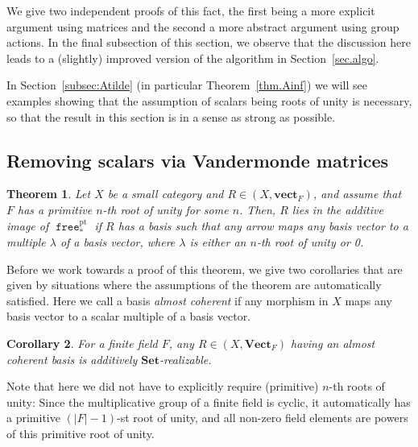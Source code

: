 \documentclass[a4paper]{amsart}
\theoremstyle{plain}
\newtheorem{theorem}{Theorem}[section]
\newtheorem{corollary}[theorem]{Corollary}
\theoremstyle{definition}
\theoremstyle{remark}
\newcommand{\funct}[1]{\operatorname{\mathtt{#1}}}
\newcommand{\Set}{\mathbf{Set}}
\newcommand{\VectF}{\mathbf{Vect}_F}
\newcommand{\vectF}{\mathbf{vect}_F}
\begin{document}
We give two independent proofs of this fact, the first being a more explicit argument using matrices and the second a more abstract argument using group actions. In the final subsection of this section, we observe that the discussion here leads to a (slightly) improved version of the algorithm in Section~\ref{sec.algo}.

In Section~\ref{subsec:Atilde} (in particular Theorem~\ref{thm.Ainf}) we will see examples showing that the assumption of scalars being roots of unity is necessary, so that the result in this section is in a sense as strong as possible.

\subsection{Removing scalars via Vandermonde matrices}
\label{sec.vandermonde}
\begin{theorem} \label{thm.isinduced2}
Let $X$ be a small category and \( R\in (X, \vectF) \), and assume that $F$ has a primitive $n$-th root of unity for some $n$. Then, $R$ lies in the additive image of $\funct{free}^\mathrm{pt}_*$ if $R$ has a basis such that any arrow maps any basis vector to a multiple $\lambda$ of a basis vector, where $\lambda$ is either an $n$-th root of unity or 0. 
\end{theorem}

Before we work towards a proof of this theorem, we give two corollaries that are given by situations where the assumptions of the theorem are automatically satisfied. Here we call a basis \emph{almost coherent} if any morphism in \( X \) maps any basis vector to a scalar multiple of a basis vector.
  
\begin{corollary} \label{cor.near_mult_basis_is_enough}
For a finite field \( F \), any \( R \in(X, \VectF) \) having an almost coherent basis is additively \( \Set \)-realizable.
\end{corollary}

Note that here we did not have to explicitly require (primitive) \( n \)-th roots of unity: Since the multiplicative group of a finite field is cyclic, it automatically has a primitive $(|F|-1)$-st root of unity, and all non-zero field elements are powers of this primitive root of unity.
\end{document}
